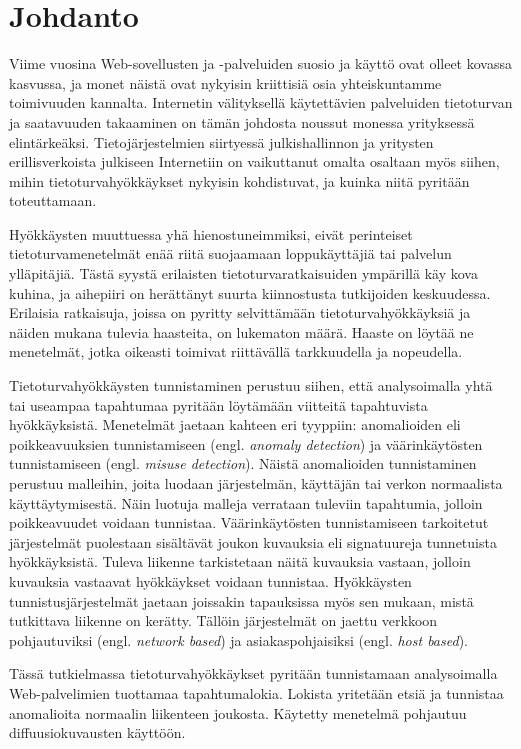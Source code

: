 
\chapter{Johdanto}

Viime vuosina Web-sovellusten ja -palveluiden suosio ja käyttö ovat
olleet kovassa kasvussa, ja monet näistä ovat nykyisin kriittisiä osia
yhteiskuntamme toimivuuden kannalta. Internetin välityksellä
käytettävien palveluiden tietoturvan ja saatavuuden takaaminen on
tämän johdosta noussut monessa yrityksessä
elintärkeäksi. Tietojärjestelmien siirtyessä julkishallinnon ja
yritysten erillisverkoista julkiseen Internetiin on vaikuttanut omalta
osaltaan myös siihen, mihin tietoturvahyökkäykset nykyisin
kohdistuvat, ja kuinka niitä pyritään toteuttamaan.

Hyökkäysten muuttuessa yhä hienostuneimmiksi, eivät perinteiset
tietoturvamenetelmät enää riitä suojaamaan loppukäyttäjiä tai palvelun
ylläpitäjiä. Tästä syystä erilaisten tietoturvaratkaisuiden ympärillä
käy kova kuhina, ja aihepiiri on herättänyt suurta kiinnostusta
tutkijoiden keskuudessa. Erilaisia ratkaisuja, joissa on pyritty
selvittämään tietoturvahyökkäyksiä ja näiden mukana tulevia haasteita,
on lukematon määrä. Haaste on löytää ne menetelmät, jotka oikeasti
toimivat riittävällä tarkkuudella ja nopeudella.

Tietoturvahyökkäysten tunnistaminen perustuu siihen, että
analysoimalla yhtä tai useampaa tapahtumaa pyritään löytämään
viitteitä tapahtuvista hyökkäyksistä. Menetelmät jaetaan kahteen eri
tyyppiin: anomalioiden eli poikkeavuuksien tunnistamiseen
(engl. \textit{anomaly detection}) ja väärinkäytösten tunnistamiseen
(engl. \textit{misuse detection}). Näistä anomalioiden tunnistaminen
perustuu malleihin, joita luodaan järjestelmän, käyttäjän tai verkon
normaalista käyttäytymisestä. Näin luotuja malleja verrataan tuleviin
tapahtumia, jolloin poikkeavuudet voidaan tunnistaa. Väärinkäytösten
tunnistamiseen tarkoitetut järjestelmät puolestaan sisältävät joukon
kuvauksia eli signatuureja tunnetuista hyökkäyksistä. Tuleva liikenne
tarkistetaan näitä kuvauksia vastaan, jolloin kuvauksia vastaavat
hyökkäykset voidaan tunnistaa. Hyökkäysten tunnistusjärjestelmät
jaetaan joissakin tapauksissa myös sen mukaan, mistä tutkittava
liikenne on kerätty. Tällöin järjestelmät on jaettu verkkoon
pohjautuviksi (engl. \textit{network based}) ja asiakaspohjaisiksi
(engl. \textit{host based}).

Tässä tutkielmassa tietoturvahyökkäykset pyritään tunnistamaan
analysoimalla Web-palvelimien tuottamaa tapahtumalokia. Lokista
yritetään etsiä ja tunnistaa anomalioita normaalin liikenteen
joukosta.  Käytetty menetelmä pohjautuu diffuusiokuvausten käyttöön.

